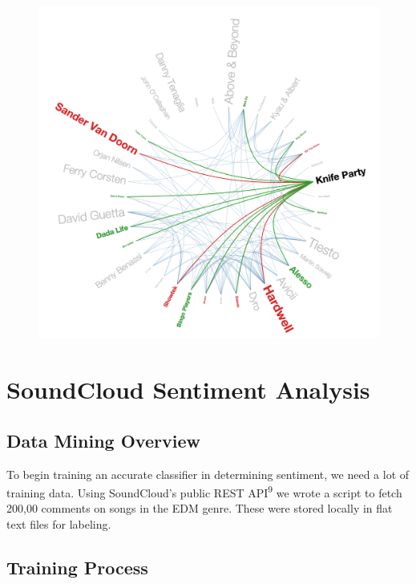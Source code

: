 \documentclass[12pt]{dalcsthesis}
\begin{document}
\begin{figure}[h]
\includegraphics[scale=.5]{knife_party}
\centering
\end{figure}

\chapter{SoundCloud Sentiment Analysis}

\section{Data Mining Overview}

To begin training an accurate classifier in determining sentiment, we need a lot of training data. Using SoundCloud's public REST API\textsuperscript{9} we wrote a script to fetch 200,00 comments on songs in the EDM genre. These were stored locally in flat text files for labeling.

\section{Training Process}
\end{document}
